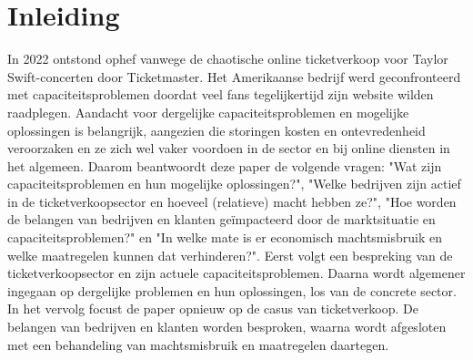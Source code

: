 
\section{Inleiding}

In 2022 ontstond ophef vanwege de chaotische online ticketverkoop voor 
Taylor Swift-concerten door Ticketmaster. Het Amerikaanse bedrijf werd
geconfronteerd met capaciteitsproblemen doordat veel fans tegelijkertijd
zijn website wilden raadplegen. Aandacht voor dergelijke capaciteitsproblemen
en mogelijke oplossingen is belangrijk, aangezien die storingen kosten en
ontevredenheid veroorzaken en ze zich wel vaker voordoen in de sector en bij
online diensten in het algemeen. Daarom beantwoordt deze paper de volgende
vragen: "Wat zijn capaciteitsproblemen en hun mogelijke oplossingen?",
"Welke bedrijven zijn actief in de ticketverkoopsector en hoeveel (relatieve)
macht hebben ze?", "Hoe worden de belangen van bedrijven en klanten
geïmpacteerd door de marktsituatie en capaciteitsproblemen?" en
"In welke mate is er economisch machtsmisbruik en welke maatregelen kunnen
dat verhinderen?". Eerst volgt een bespreking van de ticketverkoopsector en
zijn actuele capaciteitsproblemen. Daarna wordt algemener ingegaan op dergelijke
problemen en hun oplossingen, los van de concrete sector. In het vervolg focust
de paper opnieuw op de casus van ticketverkoop. De belangen van
bedrijven en klanten worden besproken, waarna wordt afgesloten met een
behandeling van machtsmisbruik en maatregelen daartegen.